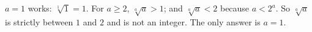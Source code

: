 $a=1$ works: $\sqrt[1]1=1$. For $a\ge2$, $\sqrt[a]a>1$; and $\sqrt[a]a<2$ because $a<2^a$. So $\sqrt[a]a$ is strictly between $1$ and $2$ and is not an integer. The only answer is $\boxed{a=1}$.
